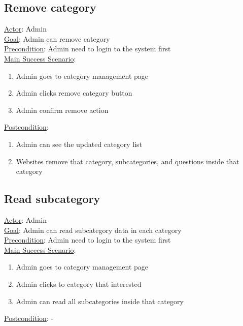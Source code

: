 \documentclass[12pt,oneside,openright,a4paper]{cpe-english-project}
\begin{document}
\subsection{Remove category}
\underline{Actor}: Admin\\
\underline{Goal}: Admin can remove category\\
\underline{Precondition}: Admin need to login to the system first\\
\underline{Main Success Scenario}:
\begin{enumerate}[label={\arabic*.}]
	\item Admin goes to category management page
	\item Admin clicks remove category button
	\item Admin confirm remove action
\end{enumerate}
\underline{Postcondition}: 
\begin{enumerate}[label={\arabic*.}]
	\item Admin can see the updated category list
	\item Websites remove that category, subcategories, and questions inside that category
\end{enumerate}

\subsection{Read subcategory}
\underline{Actor}: Admin\\
\underline{Goal}: Admin can read subcategory data in each category\\
\underline{Precondition}: Admin need to login to the system first\\
\underline{Main Success Scenario}:
\begin{enumerate}[label={\arabic*.}]
	\item Admin goes to category management page
	\item Admin clicks to category that interested
	\item Admin can read all subcategories inside that category
\end{enumerate}
\underline{Postcondition}: -
\end{document}
